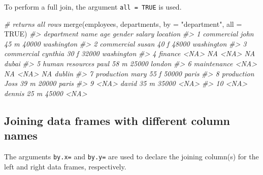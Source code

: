 \documentclass[
]{book}
\newenvironment{Shaded}{\begin{snugshade}}{\end{snugshade}}
\newcommand{\AttributeTok}[1]{\textcolor[rgb]{0.77,0.63,0.00}{#1}}
\newcommand{\CommentTok}[1]{\textcolor[rgb]{0.56,0.35,0.01}{\textit{#1}}}
\newcommand{\ConstantTok}[1]{\textcolor[rgb]{0.00,0.00,0.00}{#1}}
\newcommand{\FunctionTok}[1]{\textcolor[rgb]{0.00,0.00,0.00}{#1}}
\newcommand{\NormalTok}[1]{#1}
\newcommand{\StringTok}[1]{\textcolor[rgb]{0.31,0.60,0.02}{#1}}
\begin{document}
To perform a full join, the argument \texttt{all\ =\ TRUE} is used.

\begin{Shaded}
\begin{Highlighting}[]
\CommentTok{\# returns all rows}
\FunctionTok{merge}\NormalTok{(employees, departments, }\AttributeTok{by =} \StringTok{"department"}\NormalTok{, }\AttributeTok{all =} \ConstantTok{TRUE}\NormalTok{)}
\CommentTok{\#\textgreater{}         department    name age gender salary   location}
\CommentTok{\#\textgreater{} 1       commercial    john  45      m  40000 washington}
\CommentTok{\#\textgreater{} 2       commercial   susan  40      f  48000 washington}
\CommentTok{\#\textgreater{} 3       commercial cynthia  30      f  32000 washington}
\CommentTok{\#\textgreater{} 4          finance    \textless{}NA\textgreater{}  NA   \textless{}NA\textgreater{}     NA      dubai}
\CommentTok{\#\textgreater{} 5  human resources    paul  58      m  25000     london}
\CommentTok{\#\textgreater{} 6      maintenance    \textless{}NA\textgreater{}  NA   \textless{}NA\textgreater{}     NA     dublin}
\CommentTok{\#\textgreater{} 7       production    mary  55      f  50000      paris}
\CommentTok{\#\textgreater{} 8       production    Joss  39      m  20000      paris}
\CommentTok{\#\textgreater{} 9             \textless{}NA\textgreater{}   david  35      m  35000       \textless{}NA\textgreater{}}
\CommentTok{\#\textgreater{} 10            \textless{}NA\textgreater{}  dennis  25      m  45000       \textless{}NA\textgreater{}}
\end{Highlighting}
\end{Shaded}

\hypertarget{joining-data-frames-with-different-column-names}{%
\subsection{Joining data frames with different column names}\label{joining-data-frames-with-different-column-names}}

The arguments \texttt{by.x=} and \texttt{by.y=} are used to declare the joining column(s) for the left and right data frames, respectively.
\end{document}
